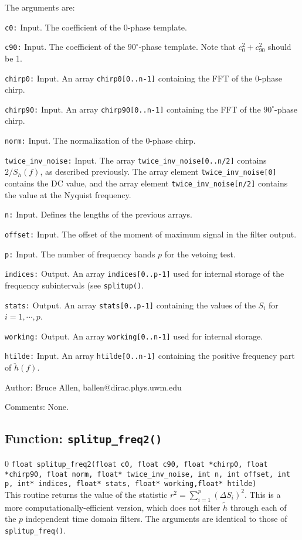 The arguments are:
\begin{description}
\item{\tt c0:} Input.  The coefficient of the 0-phase template.
\item{\tt c90:} Input.  The coefficient of the $90^\circ$-phase template.  Note that
    $c_0^2 + c_{90}^2$ should be 1.
\item{\tt chirp0:} Input.  An array {\tt chirp0[0..n-1]} containing the FFT of the 0-phase chirp.
\item{\tt chirp90:} Input.  An array {\tt chirp90[0..n-1]} containing the FFT of the $90^\circ$-phase chirp.
\item{\tt norm:} Input.  The normalization of the 0-phase chirp.
\item{\tt twice\_inv\_noise:} Input.  The array {\tt twice\_inv\_noise[0..n/2]} contains $2/S_h(f)$,
   as described previously.
The array element {\tt twice\_inv\_noise[0]} contains
   the DC value, and the array element {\tt twice\_inv\_noise[n/2]}
   contains the value at the Nyquist frequency.
\item{\tt n:} Input.  Defines the lengths of the previous arrays.
\item{\tt offset:} Input.  The offset of the moment of maximum signal in the filter output.
\item{\tt p:} Input.  The number of frequency bands $p$ for the vetoing test.
\item{\tt indices:} Output.  An array {\tt indices[0..p-1]} used for internal storage of the
   frequency subintervals (see {\tt splitup()}.
\item{\tt stats:} Output.  An array {\tt stats[0..p-1]} containing the values of the $S_i$ for $i=1,\cdots,p$.
\item{\tt working:} Output.  An array {\tt working[0..n-1]} used for internal storage.
\item{\tt htilde:} Input.  An array {\tt htilde[0..n-1]} containing the positive frequency part of
  $\tilde h(f)$.
\end{description}
\begin{description}
\item{Author:}
Bruce Allen, ballen@dirac.phys.uwm.edu
\item{Comments:}
None.
\end{description}
\clearpage

\subsection{Function: {\tt splitup\_freq2()}}
\label{ss:splitup_freq2}
\setcounter{equation}0
{\tt float splitup\_freq2(float c0, float c90, float *chirp0,  float
*chirp90, float norm, float* twice\_inv\_noise, int n, int offset, int
p, int* indices, float* stats, float* working,float* htilde)}\\
This routine returns the value of the statistic $r^2=\sum_{i=1}^p
(\Delta S_i)^2$.  This is a more computationally-efficient version,
which does not filter $\tilde h$ through each of the $p$ independent
time domain filters.  The arguments are identical to those of {\tt splitup\_freq()}.

